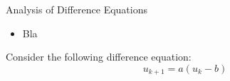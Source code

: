 %
%
%
%
%
%	
%	
%
%
%
%
%	
%
%
%
%
%
%
%
%
%

%
%



\begin{module}{Analysis of Difference Equations}
	\label{diff:analysis}

	
	
\end{module}



\begin{lesson}

	\begin{itemize}
		\item Bla
	\end{itemize}
	

\end{lesson}




\question 
	Consider the following difference equation:
		$$u_{k+1} = a(u_k - b)$$

